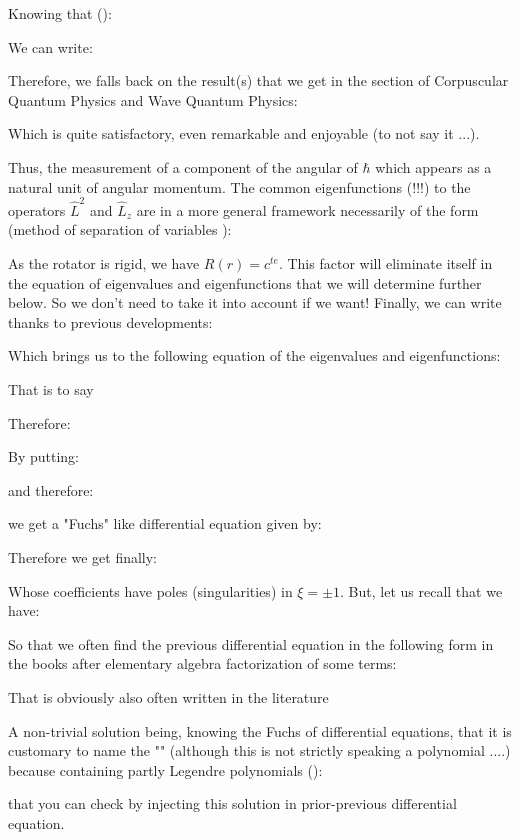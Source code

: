 	Knowing that ():
	
	We can write:
	
	Therefore, we falls back on the result(s) that we get in the section of Corpuscular Quantum Physics and Wave Quantum Physics:
	
	Which is quite satisfactory, even remarkable and enjoyable (to not say it ...).
	
	Thus, the measurement of a component of the angular of $\hbar$ which appears as a natural unit of angular momentum.
	The common eigenfunctions (!!!) to the operators $\hat{L}^2$ and $\hat{L}_z$ are in a more general framework necessarily of the form (method of separation of variables ):
	
	As the rotator is rigid, we have $R(r)=c^{te}$. This factor will eliminate itself in the equation of eigenvalues and eigenfunctions that we will determine further below. So we don't need to take it into account if we want! Finally, we can write thanks to previous developments:
	
	Which brings us to the following equation of the eigenvalues and eigenfunctions:
	
	That is to say
	
	Therefore:
	
	By putting:
	
	and therefore:
	
	we get a "Fuchs" like differential equation given by:
	
	Therefore we get finally:
	
	Whose coefficients have poles (singularities) in $\xi=\pm 1$. But, let us recall that we have:
	
	So that we often find the previous differential equation in the following form in the books after elementary algebra factorization of some terms:
	
	That is obviously also often written in the literature\label{polar equation rigid rotator}
	
	A non-trivial solution being, knowing the Fuchs of differential equations, that it is customary to name the "\label{legendre polynomial}" (although this is not strictly speaking a polynomial ....) because containing partly Legendre polynomials ():
	
	that you can check by injecting this solution in prior-previous differential equation.
	
